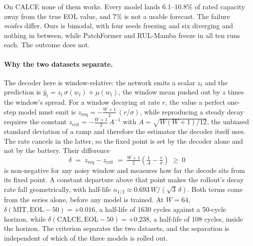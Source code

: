 On CALCE none of them works. Every model lands 6.1--10.8\% of rated capacity
away from the true EOL value, and 7\% is not a usable forecast. The failure
\emph{modes} differ. Ours is bimodal, with four seeds freezing and six diverging
and nothing in between, while PatchFormer and RUL-Mamba freeze in all ten runs
each. The outcome does not.

\paragraph{Why the two datasets separate.}
The decoder here is window-relative: the network emits a scalar $z_t$ and the
prediction is $\hat y_t = z_t\,\sigma(w_t) + \mu(w_t)$, the window mean pushed
out by $z$ times the window's spread. For a window decaying at rate $r$, the
value a perfect one-step model must emit is
$z_{\mathrm{req}} = -\tfrac{W+1}{2}\,(r/\sigma)$, while reproducing a steady
decay requires the constant
$z_{\mathrm{crit}} = -\tfrac{W+1}{2}\,A^{-1}$ with $A=\sqrt{W(W+1)/12}$, the
unbiased standard deviation of a ramp and therefore the estimator the decoder
itself uses. The rate cancels in the latter, so the fixed point is set by the
decoder alone and not by the battery. Their difference
\begin{equation}
\delta \;=\; z_{\mathrm{req}} - z_{\mathrm{crit}}
\;=\; \tfrac{W+1}{2}\left(\tfrac{1}{A} - \tfrac{r}{\sigma}\right) \;\ge\; 0
\label{eq:delta}
\end{equation}
is non-negative for any noisy window and measures how far the decode sits from
its fixed point. A constant departure above that point makes the rollout's decay
rate fall geometrically, with half-life
$n_{1/2} \approx 0.693\,W/(\sqrt{3}\,\delta)$. Both terms come from the series
alone, before any model is trained. At $W{=}64$,
$\delta(\mathrm{MIT},\mathrm{EOL}{-}50) = +0.016$, a half-life of 1630 cycles
against a 50-cycle horizon, while
$\delta(\mathrm{CALCE},\mathrm{EOL}{-}50) = +0.238$, a half-life of 108 cycles,
inside the horizon. The criterion separates the two datasets, and the separation
is independent of which of the three models is rolled out.

